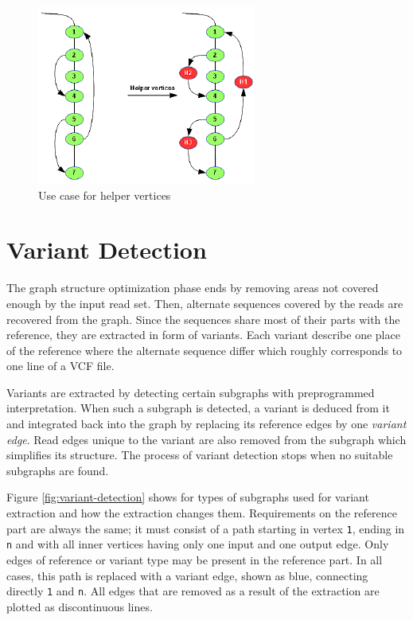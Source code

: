 \begin{figure}[h]
	\centering
	\includegraphics{img/helper-vertices.pdf}
	\caption{Use case for helper vertices}
	\label{fig:helper-vertices}
\end{figure}

\section{Variant Detection}
\label{sec:variant-detection}

The graph structure optimization phase ends by removing areas not covered enough by the input read set. Then, alternate sequences covered by the reads are recovered from the graph. Since the sequences share most of their parts with the reference, they are extracted in form of variants. Each variant describe one place of the reference where the alternate sequence differ which roughly corresponds to one line of a VCF file.

Variants are extracted by detecting certain subgraphs with preprogrammed interpretation. When such a subgraph is detected, a variant is deduced from it and integrated back into the graph by replacing its reference edges by one \textit{variant edge}. Read edges unique to the variant are also removed from the subgraph which simplifies its structure. The process of variant detection stops when no suitable subgraphs are found.

Figure \ref{fig:variant-detection} shows for types of subgraphs used for variant extraction and how the extraction changes them. Requirements on the reference part are always the same; it must consist of a path starting in vertex \texttt{1}, ending in \texttt{n} and with all inner vertices having only one input and one output edge. Only edges of reference or variant type may be present in the reference part. In all cases, this path is replaced with a variant edge, shown as blue, connecting directly \texttt{1} and \texttt{n}. All edges that are removed as a result of the extraction are plotted as discontinuous lines.

